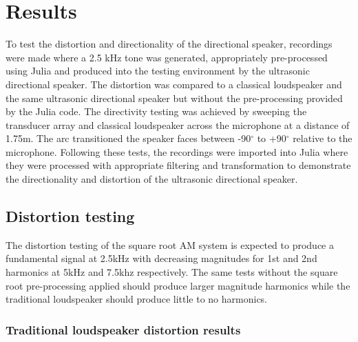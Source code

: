 \section{Results}
To test the distortion and directionality of the directional speaker, recordings were made where a 2.5 kHz tone was generated, appropriately pre-processed using Julia and produced into the testing environment by the ultrasonic directional speaker. The distortion was compared to a classical loudspeaker and the same ultrasonic directional speaker but without the pre-processing provided by the Julia code. The directivity testing was achieved by sweeping the transducer array and classical loudspeaker across the microphone at a distance of 1.75m. The arc transitioned the speaker faces between -90$^\circ$ to +90$^\circ$ relative to the microphone. Following these tests, the recordings were imported into Julia where they were processed with appropriate filtering and transformation to demonstrate the directionality and distortion of the ultrasonic directional speaker.
\subsection{Distortion testing}
The distortion testing of the square root AM system is expected to produce a fundamental signal at 2.5kHz with decreasing magnitudes for 1st and 2nd harmonics at 5kHz and 7.5khz respectively. The same tests without the square root pre-processing applied should produce larger magnitude harmonics while the traditional loudspeaker should produce little to no harmonics.
\subsubsection{Traditional loudspeaker distortion results}

